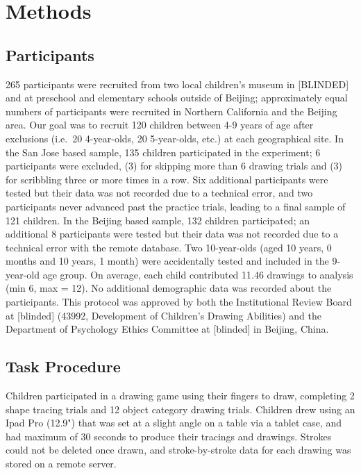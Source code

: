 \documentclass[
  english,
  man]{apa6}
\begin{document}
\hypertarget{methods}{%
\section{Methods}\label{methods}}

\hypertarget{participants}{%
\subsection{Participants}\label{participants}}

265 participants were recruited from two local children's museum in {[}BLINDED{]} and at preschool and elementary schools outside of Beijing; approximately equal numbers of participants were recruited in Northern California and the Beijing area. Our goal was to recruit 120 children between 4-9 years of age after exclusions (i.e.~20 4-year-olds, 20 5-year-olds, etc.) at each geographical site. In the San Jose based sample, 135 children participated in the experiment; 6 participants were excluded, (3) for skipping more than 6 drawing trials and (3) for scribbling three or more times in a row. Six additional participants were tested but their data was not recorded due to a technical error, and two participants never advanced past the practice trials, leading to a final sample of 121 children. In the Beijing based sample, 132 children participated; an additional 8 participants were tested but their data was not recorded due to a technical error with the remote database. Two 10-year-olds (aged 10 years, 0 months and 10 years, 1 month) were accidentally tested and included in the 9-year-old age group. On average, each child contributed 11.46 drawings to analysis (min 6, max = 12). No additional demographic data was recorded about the participants. This protocol was approved by both the Institutional Review Board at {[}blinded{]} (43992, Development of Children's Drawing Abilities) and the Department of Psychology Ethics Committee at {[}blinded{]} in Beijing, China.

\hypertarget{task-procedure}{%
\subsection{Task Procedure}\label{task-procedure}}

Children participated in a drawing game using their fingers to draw, completing 2 shape tracing trials and 12 object category drawing trials. Children drew using an Ipad Pro (12.9") that was set at a slight angle on a table via a tablet case, and had maximum of 30 seconds to produce their tracings and drawings. Strokes could not be deleted once drawn, and stroke-by-stroke data for each drawing was stored on a remote server.
\end{document}
